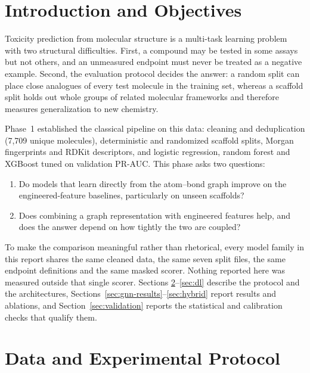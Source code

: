 \documentclass[conference]{IEEEtran}
\begin{document}
\section{Introduction and Objectives}
Toxicity prediction from molecular structure is a multi-task learning problem with two
structural difficulties. First, a compound may be tested in some assays but not others, and an
unmeasured endpoint must never be treated as a negative example. Second, the evaluation
protocol decides the answer: a random split can place close analogues of every test molecule in
the training set, whereas a scaffold split holds out whole groups of related molecular
frameworks and therefore measures generalization to new chemistry.

Phase~1 established the classical pipeline on this data: cleaning and deduplication
(7{,}709 unique molecules), deterministic and randomized scaffold splits, Morgan fingerprints
and RDKit descriptors, and logistic regression, random forest and XGBoost tuned on validation
PR-AUC. This phase asks two questions:

\begin{enumerate}[label=\textbf{Q\arabic*.}]
\item Do models that learn directly from the atom--bond graph improve on the engineered-feature
baselines, particularly on unseen scaffolds?
\item Does combining a graph representation with engineered features help, and does the answer
depend on how tightly the two are coupled?
\end{enumerate}

To make the comparison meaningful rather than rhetorical, every model family in this report
shares the same cleaned data, the same seven split files, the same endpoint definitions and the
same masked scorer. Nothing reported here was measured outside that single scorer. Sections
\ref{sec:protocol}--\ref{sec:dl} describe the protocol and the architectures,
Sections~\ref{sec:gnn-results}--\ref{sec:hybrid} report results and ablations, and
Section~\ref{sec:validation} reports the statistical and calibration checks that qualify them.

\section{Data and Experimental Protocol}
\label{sec:protocol}
\end{document}
